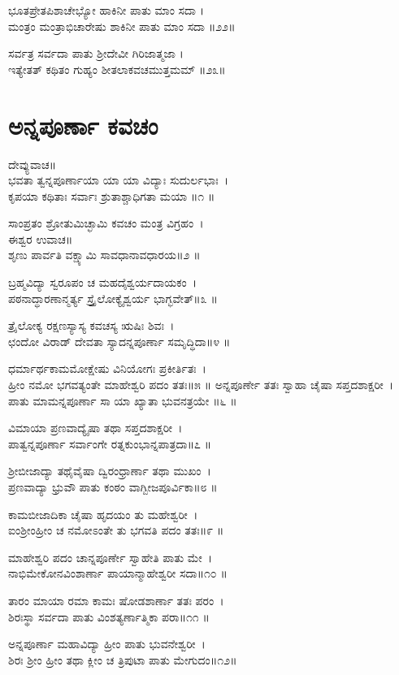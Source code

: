 ಭೂತಪ್ರೇತಪಿಶಾಚೇಭ್ಯೋ ಹಾಕಿನೀ ಪಾತು ಮಾಂ ಸದಾ ।\\
ಮಂತ್ರಂ ಮಂತ್ರಾಭಿಚಾರೇಷು ಶಾಕಿನೀ ಪಾತು ಮಾಂ ಸದಾ ॥೨೨॥

ಸರ್ವತ್ರ ಸರ್ವದಾ ಪಾತು ಶ್ರೀದೇವೀ ಗಿರಿಜಾತ್ಮಜಾ ।\\
ಇತ್ಯೇತತ್ ಕಥಿತಂ ಗುಹ್ಯಂ ಶೀತಲಾಕವಚಮುತ್ತಮಮ್ ॥೨೩॥

\section{ಅನ್ನಪೂರ್ಣಾ ಕವಚಂ}
ದೇವ್ಯುವಾಚ॥\\
ಭವತಾ ತ್ವನ್ನಪೂರ್ಣಾಯಾ ಯಾ ಯಾ ವಿದ್ಯಾಃ ಸುದುರ್ಲಭಾಃ~।\\
ಕೃಪಯಾ ಕಥಿತಾಃ ಸರ್ವಾಃ ಶ್ರುತಾಶ್ಚಾಧಿಗತಾ ಮಯಾ ॥೧ ॥

ಸಾಂಪ್ರತಂ ಶ್ರೋತುಮಿಚ್ಛಾಮಿ ಕವಚಂ ಮಂತ್ರ ವಿಗ್ರಹಂ~।\\
ಈಶ್ವರ ಉವಾಚ॥\\
ಶೃಣು ಪಾರ್ವತಿ ವಕ್ಷ್ಯಾಮಿ ಸಾವಧಾನಾವಧಾರಯ॥೨ ॥

ಬ್ರಹ್ಮವಿದ್ಯಾ ಸ್ವರೂಪಂ ಚ ಮಹದೈಶ್ವರ್ಯದಾಯಕಂ~।\\
ಪಠನಾದ್ಧಾರಣಾನ್ಮರ್ತ್ಯ ಸ್ತ್ರೈಲೋಕ್ಯೈಶ್ವರ್ಯ ಭಾಗ್ಭವೇತ್॥೩ ॥

ತ್ರೈಲೋಕ್ಯ ರಕ್ಷಣಸ್ಯಾಸ್ಯ ಕವಚಸ್ಯ ಋಷಿಃ ಶಿವಃ~।\\
ಛಂದೋ ವಿರಾಡ್ ದೇವತಾ ಸ್ಯಾದನ್ನಪೂರ್ಣಾ ಸಮೃದ್ಧಿದಾ॥೪ ॥

ಧರ್ಮಾರ್ಥಕಾಮಮೋಕ್ಷೇಷು ವಿನಿಯೋಗಃ ಪ್ರಕೀರ್ತಿತಃ~।\\
ಹ್ರೀಂ ನಮೋ ಭಗವತ್ಯಂತೇ ಮಾಹೇಶ್ವರಿ ಪದಂ ತತಃ॥೫ ॥
\newpage
ಅನ್ನಪೂರ್ಣೇ ತತಃ ಸ್ವಾಹಾ ಚೈಷಾ ಸಪ್ತದಶಾಕ್ಷರೀ~।\\
ಪಾತು ಮಾಮನ್ನಪೂರ್ಣಾ ಸಾ ಯಾ ಖ್ಯಾತಾ ಭುವನತ್ರಯೇ ॥೬ ॥

ವಿಮಾಯಾ ಪ್ರಣವಾದ್ಯೈಷಾ ತಥಾ ಸಪ್ತದಶಾಕ್ಷರೀ~।\\
ಪಾತ್ವನ್ನಪೂರ್ಣಾ ಸರ್ವಾಂಗೇ ರತ್ನಕುಂಭಾನ್ನಪಾತ್ರದಾ॥೭ ॥

ಶ್ರೀಬೀಜಾದ್ಯಾ ತಥೈವೈಷಾ ದ್ವಿರಂಧ್ರಾರ್ಣಾ ತಥಾ ಮುಖಂ~।\\
ಪ್ರಣವಾದ್ಯಾ ಭ್ರುವೌ ಪಾತು ಕಂಠಂ ವಾಗ್ಬೀಜಪೂರ್ವಿಕಾ॥೮ ॥

ಕಾಮಬೀಜಾದಿಕಾ ಚೈಷಾ ಹೃದಯಂ ತು ಮಹೇಶ್ವರೀ~।\\
ಐಂಶ್ರೀಂಹ್ರೀಂ ಚ ನಮೋಽಂತೇ ತು ಭಗವತಿ ಪದಂ ತತಃ॥೯ ॥

ಮಾಹೇಶ್ವರಿ ಪದಂ ಚಾನ್ನಪೂರ್ಣೇ ಸ್ವಾಹೇತಿ ಪಾತು ಮೇ~।\\
ನಾಭಿಮೇಕೋನವಿಂಶಾರ್ಣಾ ಪಾಯಾನ್ಮಾಹೇಶ್ವರೀ ಸದಾ॥೧೦ ॥

ತಾರಂ ಮಾಯಾ ರಮಾ ಕಾಮಃ ಷೋಡಶಾರ್ಣಾ ತತಃ ಪರಂ~।\\
ಶಿರಃಸ್ಥಾ ಸರ್ವದಾ ಪಾತು ವಿಂಶತ್ಯರ್ಣಾತ್ಮಿಕಾ ಪರಾ॥೧೧ ॥

ಅನ್ನಪೂರ್ಣಾ ಮಹಾವಿದ್ಯಾ ಹ್ರೀಂ ಪಾತು ಭುವನೇಶ್ವರೀ~।\\
ಶಿರಃ ಶ್ರೀಂ ಹ್ರೀಂ ತಥಾ ಕ್ಲೀಂ ಚ ತ್ರಿಪುಟಾ ಪಾತು ಮೇಗುದಂ॥೧೨॥

